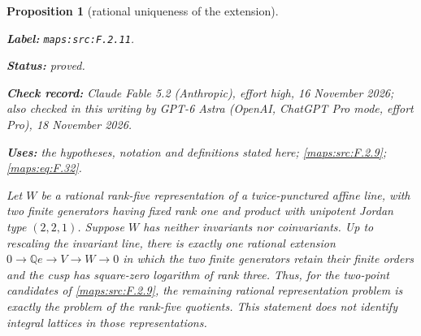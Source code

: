 \documentclass[11pt,a4paper]{article}
\newtheorem{proposition}[proposition]{Proposition}
\theoremstyle{definition}
\newcommand{\StatementRecord}[4]{\par\smallskip\begingroup\upshape\raggedright\noindent\textbf{Label:} \nolinkurl{#1}.\par\noindent\textbf{Status:} #2.\par\noindent\textbf{Check record:} #3.\par\noindent\textbf{Uses:} #4.\par\endgroup\smallskip}
\newcommand{\CurrentChecker}{GPT-6 Astra (OpenAI, ChatGPT Pro mode, effort Pro), 18 November 2026}
\begin{document}
\begin{proposition}[rational uniqueness of the extension]\label{maps:src:F.2.11}
\StatementRecord{maps:src:F.2.11}{proved}{Claude Fable 5.2 (Anthropic), effort high, 16 November 2026; also checked in this writing by \CurrentChecker}{the hypotheses, notation and definitions stated here; \cref{maps:src:F.2.9}; \cref{maps:eq:F.32}}


Let $W$ be a rational rank-five representation of a
twice-punctured affine line, with two finite generators
having fixed rank one and product with unipotent Jordan type
$(2,2,1)$.  Suppose $W$ has neither invariants nor
coinvariants.  Up to rescaling the invariant line, there is
exactly one rational extension
$0\to\mathbb Qe\to V\to W\to0$ in which the two finite
generators retain their finite orders and the cusp has
square-zero logarithm of rank three.  Thus, for the
two-point candidates of \ref{maps:src:F.2.9}, the remaining rational
representation problem is exactly the problem of the
rank-five quotients.  This statement does not identify
integral lattices in those representations.

\end{proposition}
\end{document}
